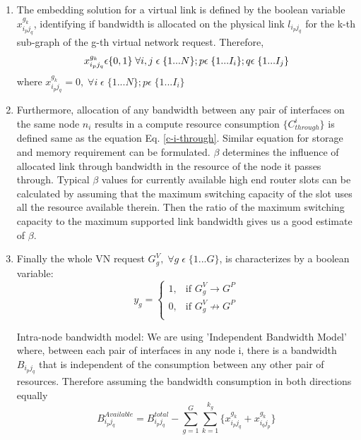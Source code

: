 \documentclass[article,dr=phil,type=msc ,colorback,accentcolor=tud4b]{tudthesis}
\begin{document}
\begin{enumerate}[label=(\Alph*)]
\begin{enumerate}
\item The embedding solution for a virtual link is defined by the boolean variable $x_{i_{p}j_{q}}^{g_{k}}$, identifying if bandwidth is allocated on the physical link $l_{i_{p}j_{q}}$ for the k-th sub-graph of the g-th virtual network request. Therefore, 
\begin{equation}
x_{i_{p}j_{q}}^{g_{k}} \epsilon \{0, 1\} \;\forall i, j \;\epsilon\; \{1...N\}; p \epsilon \; \{1...I_{i}\}; q \epsilon \; \{1...I_{j}\}\\
\end{equation}
where $x_{i_{p}j_{q}}^{g_{k}} = 0, \; \forall i \;\epsilon\; \{1...N\}; p \epsilon \; \{1...I_{i}\}$\newline
\item Furthermore, allocation of any bandwidth between any pair of interfaces on the same node $n_{i}$ results in a compute resource consumption $\{C^{i}_{through}\}$ is defined same as the equation Eq. \ref{c-i-through}. Similar equation for storage and memory requirement can be formulated. $\beta$ determines the influence of allocated link through bandwidth in the resource of the node it passes through. Typical $\beta$ values for currently available high end router slots can be calculated by assuming that the maximum switching capacity of the slot uses all the resource available therein. Then the ratio of the maximum switching capacity to the maximum supported link bandwidth gives us a good estimate of $\beta$.

\item 	Finally the whole VN request  $G_{g}^{V}, \; \forall g \;\epsilon\; \{1...G\}$, is characterizes by a boolean variable:
\begin{equation}
y_{g}=
\begin{cases}
1, & \text{if }   G_{g}^{V}\rightarrow G^{P} \\
0, & \text{if }   G_{g}^{V}\not\rightarrow G^{P} \\
\end{cases}
\end{equation}

Intra-node bandwidth model: We are using 'Independent Bandwidth Model' where, between each pair of interfaces in any node i, there is a bandwidth $B_{i_{p}j_{q}}$ that is independent of the consumption between any other pair of resources. Therefore assuming the bandwidth consumption in both directions equally
\begin{equation}
B_{i_{p}j_{q}}^{Available} = B_{i_{p}j_{q}}^{total} -  \sum_{g=1}^{G} \sum_{k=1}^{k_{g}}  \{ x_{i_{p}j_{q}}^{g_{k}} + x_{i_{q}j_{p}}^{g_{k}}\}
\end{equation}
\end{enumerate}


\end{enumerate}
\end{document}
